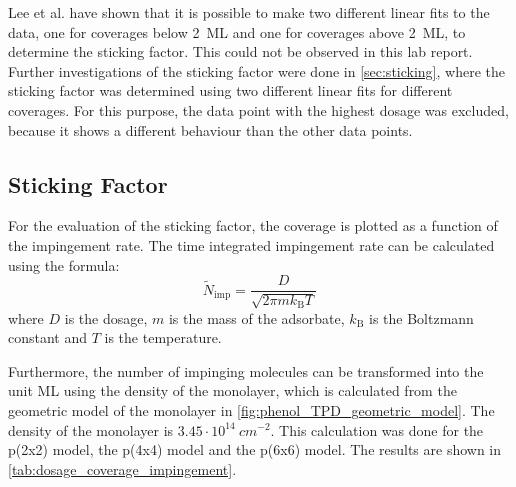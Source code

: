 \documentclass[fontsize=11pt,reqno,a4paper,oneside]{scrartcl}
\begin{document}
Lee et al.\autocite{Lee2001} have shown that it is possible to make two different linear fits to the data, one for coverages below 2~\ac{ML} and one for coverages above 2~\ac{ML}, to determine the sticking factor. This could not be observed in this lab report. Further investigations of the sticking factor were done in \autoref{sec:sticking}, where the sticking factor was determined using two different linear fits for different coverages. For this purpose, the data point with the highest dosage was excluded, because it shows a different behaviour than the other data points.

\clearpage
\subsection{Sticking Factor}
\label{sec:sticking}

For the evaluation of the sticking factor, the coverage is plotted as a function of the impingement rate. The time integrated impingement rate can be calculated using the formula:
\begin{equation}
\widetilde{N}_\mathrm{imp} = \frac{D}{\sqrt{2\pi m k_\mathrm{B} T}}
\end{equation}
where $D$ is the dosage, $m$ is the mass of the adsorbate, $k_\mathrm{B}$ is the Boltzmann constant and $T$ is the temperature.

Furthermore, the number of impinging molecules can be transformed into the unit ML using the density of the monolayer, which is calculated from the geometric model of the monolayer in \autoref{fig:phenol_TPD_geometric_model}. The density of the monolayer is $3.45\cdot 10^{14}~\si{cm^{-2}}$. This calculation was done for the p(2x2) model, the p(4x4) model and the p(6x6) model. The results are shown in \autoref{tab:dosage_coverage_impingement}.
\end{document}
